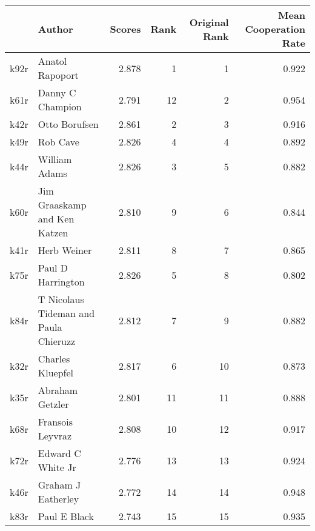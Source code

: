 \begin{tabular}{llrrrr}
\toprule
 & Author & Scores & Rank & Original Rank & Mean Cooperation Rate \\
\midrule
k92r & Anatol Rapoport & 2.878 & 1 & 1 & 0.922 \\
k61r & Danny C Champion & 2.791 & 12 & 2 & 0.954 \\
k42r & Otto Borufsen & 2.861 & 2 & 3 & 0.916 \\
k49r & Rob Cave & 2.826 & 4 & 4 & 0.892 \\
k44r & William Adams & 2.826 & 3 & 5 & 0.882 \\
k60r & Jim Graaskamp and Ken Katzen & 2.810 & 9 & 6 & 0.844 \\
k41r & Herb Weiner & 2.811 & 8 & 7 & 0.865 \\
k75r & Paul D Harrington & 2.826 & 5 & 8 & 0.802 \\
k84r & T Nicolaus Tideman and Paula Chieruzz & 2.812 & 7 & 9 & 0.882 \\
k32r & Charles Kluepfel & 2.817 & 6 & 10 & 0.873 \\
k35r & Abraham Getzler & 2.801 & 11 & 11 & 0.888 \\
k68r & Fransois Leyvraz & 2.808 & 10 & 12 & 0.917 \\
k72r & Edward C White Jr & 2.776 & 13 & 13 & 0.924 \\
k46r & Graham J Eatherley & 2.772 & 14 & 14 & 0.948 \\
k83r & Paul E Black & 2.743 & 15 & 15 & 0.935 \\
\bottomrule
\end{tabular}
